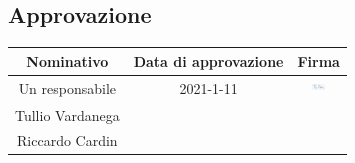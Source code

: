 \subsection{Approvazione}
\begin{table}[H]
	\centering
	\renewcommand{\arraystretch}{1.5}
	\begin{tabular}{|c|c|c|}
		\hline
		\rowcolor{lighter-grayer}
		Nominativo & Data di approvazione & Firma \\
		\hline
		Un responsabile & 2021-1-11 & \includegraphics[width=0.3\textwidth, height=5mm]{res/images/firma5}\\ 
		\hline
		Tullio Vardanega & & \\
		\hline
		Riccardo Cardin & & \\
		\hline
	\end{tabular}
\end{table}
